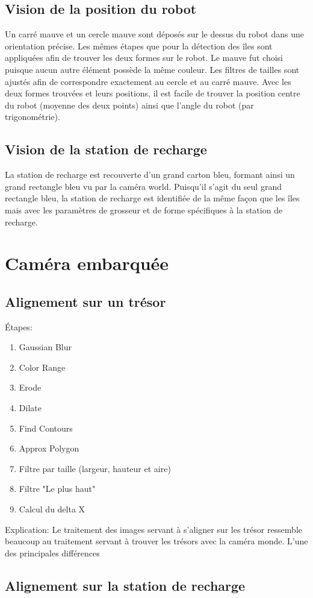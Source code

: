 \subsection{Vision de la position du robot}

Un carré mauve et un cercle mauve sont déposés sur le dessus du robot dans une orientation précise. Les mêmes étapes que pour la détection des îles sont appliquées afin de trouver les deux formes sur le robot. Le mauve fut choisi puisque aucun autre élément possède la même couleur. Les filtres de tailles sont ajustés afin de correspondre exactement au cercle et au carré mauve. Avec les deux formes trouvées et leurs positions, il est facile de trouver la position centre du robot (moyenne des deux points) ainsi que l'angle du robot (par trigonométrie).


\subsection{Vision de la station de recharge}

La station de recharge est recouverte d'un grand carton bleu, formant ainsi un grand rectangle bleu vu par la caméra world. Puisqu'il s'agit du seul grand rectangle bleu, la station de recharge est identifiée de la même façon que les îles mais avec les paramètres de grosseur et de forme spécifiques à la station de recharge.

\section{Caméra embarquée}

\subsection{Alignement sur un trésor}

Étapes:
\begin{enumerate}
\item Gaussian Blur
\item Color Range
\item Erode
\item Dilate
\item Find Contours
\item Approx Polygon
\item Filtre par taille (largeur, hauteur et aire)
\item Filtre "Le plus haut"
\item Calcul du delta X
\end{enumerate}

Explication: Le traitement des images servant à s'aligner sur les trésor ressemble beaucoup au traitement servant à trouver les trésors avec la caméra monde.  L'une des principales différences

\subsection{Alignement sur la station de recharge}
